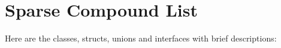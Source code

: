 \section{Sparse Compound List}
Here are the classes, structs, unions and interfaces with brief descriptions:\begin{CompactList}
\item{}
\end{CompactList}
